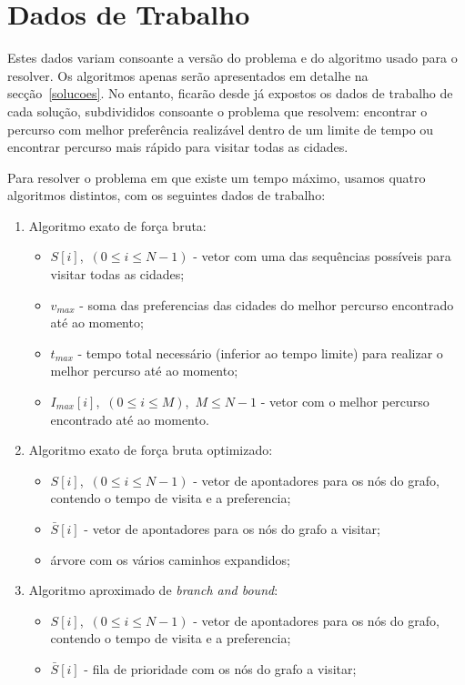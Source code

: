 \documentclass[12pt,a4paper,reqno]{report}
\numberwithin{equation}{section}
\begin{document}
\section{Dados de Trabalho}

Estes dados variam consoante a versão do problema e do algoritmo usado para o resolver. Os algoritmos apenas serão apresentados em detalhe na secção~\ref{solucoes}. No entanto, ficarão desde já expostos os dados de trabalho de cada solução, subdivididos consoante o problema que resolvem: encontrar o percurso com melhor preferência realizável dentro de um limite de tempo ou encontrar percurso mais rápido para visitar todas as cidades.

Para resolver o problema em que existe um tempo máximo, usamos quatro algoritmos distintos, com os seguintes dados de trabalho:
\begin{enumerate}
	\item Algoritmo exato de força bruta:
	\begin{itemize}
		\item $S[i]$,~$(0 \leq i \leq N-1)$ - vetor com uma das sequências possíveis para visitar todas as cidades;
		\item $v_{max}$ - soma das preferencias das cidades do melhor percurso encontrado até ao momento;
		\item $t_{max}$ - tempo total necessário (inferior ao tempo limite) para realizar o melhor percurso até ao momento;
		\item $I_{max}[i]$,~$(0 \leq i \leq M)$,~$ M \leq N - 1$ - vetor com o melhor percurso encontrado até ao momento.
	\end{itemize}
	\item Algoritmo exato de força bruta optimizado:
	\begin{itemize}
		\item $S[i]$,~$(0 \leq i \leq N-1)$ - vetor de apontadores para os nós do grafo, contendo o tempo de visita e a preferencia;
		\item $\bar{S}[i]$ - vetor de apontadores para os nós do grafo a visitar;
		\item árvore com os vários caminhos expandidos;
	\end{itemize}
	\item Algoritmo aproximado de \emph{branch and bound}:
	\begin{itemize}
		\item $S[i]$,~$(0 \leq i \leq N-1)$ - vetor de apontadores para os nós do grafo, contendo o tempo de visita e a preferencia;
		\item $\bar{S}[i]$ - fila de prioridade com os nós do grafo a visitar;

\end{itemize}
\end{enumerate}
\end{document}
